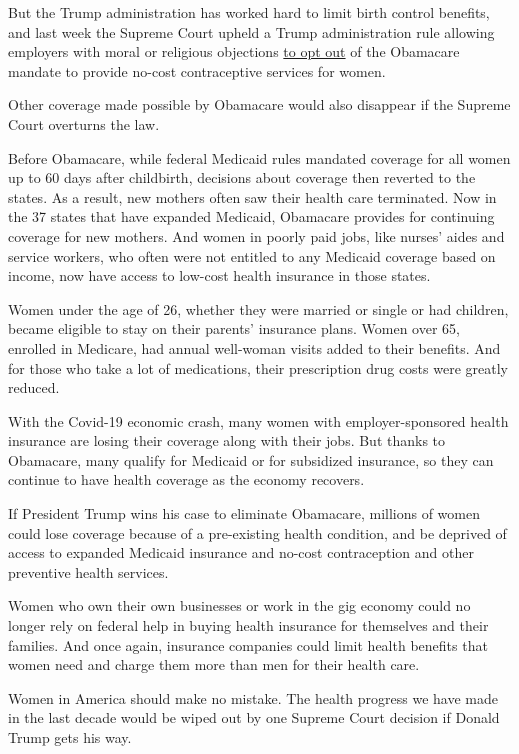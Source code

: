 But the Trump administration has worked hard to limit birth control
benefits, and last week the Supreme Court upheld a Trump administration
rule allowing employers with moral or religious objections
\href{https://www.nytimes3xbfgragh.onion/2020/07/08/us/supreme-court-birth-control-obamacare.html}{to
opt out} of the Obamacare mandate to provide no-cost contraceptive
services for women.

Other coverage made possible by Obamacare would also disappear if the
Supreme Court overturns the law.

Before Obamacare, while federal Medicaid rules mandated coverage for all
women up to 60 days after childbirth, decisions about coverage then
reverted to the states. As a result, new mothers often saw their health
care terminated. Now in the 37 states that have expanded Medicaid,
Obamacare provides for continuing coverage for new mothers. And women in
poorly paid jobs, like nurses' aides and service workers, who often were
not entitled to any Medicaid coverage based on income, now have access
to low-cost health insurance in those states.

Women under the age of 26, whether they were married or single or had
children, became eligible to stay on their parents' insurance plans.
Women over 65, enrolled in Medicare, had annual well-woman visits added
to their benefits. And for those who take a lot of medications, their
prescription drug costs were greatly reduced.

With the Covid-19 economic crash, many women with employer-sponsored
health insurance are losing their coverage along with their jobs. But
thanks to Obamacare, many qualify for Medicaid or for subsidized
insurance, so they can continue to have health coverage as the economy
recovers.

If President Trump wins his case to eliminate Obamacare, millions of
women could lose coverage because of a pre-existing health condition,
and be deprived of access to expanded Medicaid insurance and no-cost
contraception and other preventive health services.

Women who own their own businesses or work in the gig economy could no
longer rely on federal help in buying health insurance for themselves
and their families. And once again, insurance companies could limit
health benefits that women need and charge them more than men for their
health care.

Women in America should make no mistake. The health progress we have
made in the last decade would be wiped out by one Supreme Court decision
if Donald Trump gets his way.

